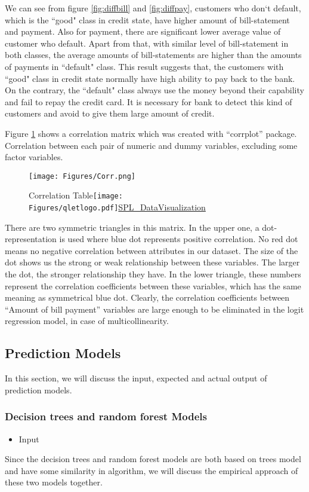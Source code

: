 \documentclass[a4paper,11pt]{article}
\begin{document}
We can see from figure \ref{fig:diffbill} and \ref{fig:diffpay}, customers who don`t default, which is the ``good" class in credit state, have higher amount of bill-statement and payment. Also for payment, there are significant lower average value of customer who default. Apart from that, with similar level of bill-statement in both classes, the average amounts of bill-statements are higher than the amounts of payments in ``default" class. This result suggests that, the customers with ``good" class in credit state normally have high ability to pay back to the bank. On the contrary, the ``default" class always use the money beyond their capability and fail to repay the credit card. It is necessary for bank to detect this kind of customers and avoid to give them large amount of credit.

Figure \ref{fig:Corr} shows a correlation matrix which was created with ``corrplot'' package. Correlation between each pair of numeric and dummy variables, excluding some factor variables. 

 \begin{figure}[!ht] 
	\centering\texttt{[image: Figures/Corr.png]} 
	\caption{Correlation Table\protect\texttt{[image: Figures/qletlogo.pdf]}\href{https://github.com/Jingmin24/R-programming/tree/master/SPL_DataVisualization}{SPL\_DataVisualization}}\label{fig:Corr} 
\end{figure}
There are two symmetric triangles in this matrix. In the upper one, a dot-representation is used where blue dot represents positive correlation. No red dot means no negative correlation between attributes in our dataset. The size of the dot shows us the strong or weak relationship between these variables. The larger the dot, the stronger relationship they have. In the lower triangle, these numbers represent the correlation coefficients between these variables, which has the same meaning as symmetrical blue dot. Clearly, the correlation coefficients between ``Amount of bill payment'' variables are large enough to be eliminated in the logit regression model, in case of multicollinearity.
\subsection{Prediction Models}
In this section, we will discuss the input, expected and actual output of prediction models.
\subsubsection{Decision trees and random forest Models} 
\begin{itemize}
	\item Input
\end{itemize}
Since the decision trees and random forest models are both based on trees model and have some similarity in algorithm, we will discuss the empirical approach of these two models together.
\end{document}
